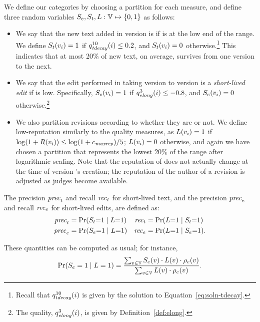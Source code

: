 We define our categories by choosing a partition for each measure,
and define three random variables $S_e, S_t, L: \versions{}
\mapsto \set{0,1}$ as follows:
\begin{itemize}
\item We say that the new text added in version 
  is  if  is at
  the low end of the range.
  We define $S_t(v_{i})=1$ if $\quality{tdecay}{10}{i} \leq  0.2$,
  and $S_t(v_{i})=0$ otherwise.\footnote{Recall that
  $\quality{tdecay}{10}{i}$ is given by the solution to
  Equation~\ref{eq:soln-tdecay}.}
  This indicates that at most 20\% of new text, on
  average, survives from one version to the next.

\item We say that the edit performed in taking version
   to version 
  is a \textit{short-lived edit} if
   is low.
  Specifically, $S_e(v_{i})=1$ if $\quality{elong}{3}{i} \leq -0.8$,
  and $S_e(v_{i})=0$ otherwise.\footnote{The quality,
  $\quality{elong}{3}{i}$, is given by Definition~\ref{def:elong}.}

\item We also partition revisions according to whether
  they are  or not.
  We define low-reputation similarly to the quality measures,
  as $L(v_{i})=1$ if
  $\log (1+R(v_{i})) \leq \log(1+{c_{{\text{\textit{maxrep}}}}}) / 5$;
  $L(v_{i})=0$ otherwise, and again we have chosen a
  partition that represents the lowest 20\% of the range
  after logarithmic scaling.
  Note that the reputation of  does not actually
  change at the time of version 's creation; the reputation
  of the author of a revision
  is adjusted as judges become available.

\end{itemize}
%
The precision ${\text{\textit{prec}}}_t$ and recall ${\text{\textit{rec}}}_t$
for short-lived text, and
the precision ${\text{\textit{prec}}}_e$ and recall ${\text{\textit{rec}}}_e$
for short-lived edits, are defined as:
%
\begin{align*}
    {\text{\textit{prec}}}_t & = \textstyle\Pr(S_t{=}1 \mid L{=}1)
  & {\text{\textit{rec}}}_t & = \textstyle\Pr(L{=}1 \mid S_t{=}1) \\
    {\text{\textit{prec}}}_e & = \textstyle\Pr(S_e{=}1 \mid L{=}1)
  & {\text{\textit{rec}}}_e & = \textstyle\Pr(L{=}1 \mid S_e{=}1).
\end{align*}
\begin{comment}
\ifshort
For short-lived text, the {\em precision\/} is
$
  \textstyle \prect = \Pr(S_t=1 \mid L=1)
$,
and the {\em recall\/} is
$
  \textstyle \recallt = \Pr(L=1 \mid S_t=1)
$.
Similarly, for short-lived edits, we define the
precision is $\prece = \Pr(S_e=1 \mid L=1)$,
and the recall is $\recalle = \Pr(L=1 \mid S_e=1)$.
\fi
\end{comment}
These quantities can be computed as usual; for instance,
\begin{equation*}
  {\textstyle \Pr} (S_e=1 \mid L=1) =
  \frac{\sum_{v \in \versions{}} S_e(v) \cdot L(v) \cdot \editmass(v)}{%
    \sum_{v \in \versions{}} L(v) \cdot \editmass(v)}.
\end{equation*}


